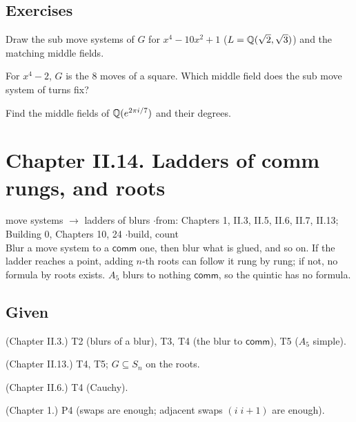 \subsection*{Exercises}

\begin{lines}
\item[\lab{E1}] Draw the sub move systems of $G$ for $x^4 - 10x^2 + 1$ ($L = \mathbb{Q}(\sqrt2, \sqrt3)$) and the matching middle fields.
\item[\lab{E2}] For $x^4 - 2$, $G$ is the $8$ moves of a square. Which middle field does the sub move system of turns fix?
\item[\lab{E3}] Find the middle fields of $\mathbb{Q}(e^{2\pi i/7})$ and their degrees.
\end{lines}

\newpage

\section*{Chapter II.14. Ladders of comm rungs, and roots}
\begin{center}
{\normalsize move systems $\to$ ladders of blurs \quad$\cdot$\quad from: Chapters 1, II.3, II.5, II.6, II.7, II.13; Building 0, Chapters 10, 24 \quad$\cdot$\quad build, count}\\[4pt]
{\small Blur a move system to a $\mathsf{comm}$ one, then blur what is glued, and so on. If the ladder reaches a point, adding $n$-th roots can follow it rung by rung; if not, no formula by roots exists. $A_5$ blurs to nothing $\mathsf{comm}$, so the quintic has no formula.}
\end{center}

\subsection*{Given}

\begin{lines}
\item[\lab{G1}] (Chapter II.3.) T2 (blurs of a blur), T3, T4 (the blur to $\mathsf{comm}$), T5 ($A_5$ simple).
\item[\lab{G2}] (Chapter II.13.) T4, T5; $G \subseteq S_n$ on the roots.
\item[\lab{G3}] (Chapter II.6.) T4 (Cauchy).
\item[\lab{G4}] (Chapter 1.) P4 (swaps are enough; adjacent swaps $(i\; i{+}1)$ are enough).
\end{lines}

